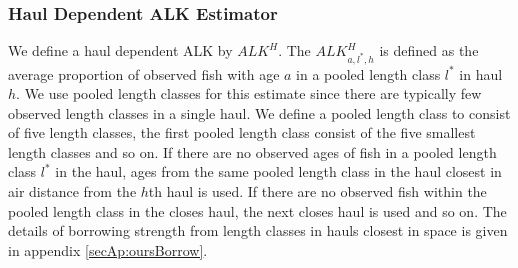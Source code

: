 \documentclass[a4paper 12pt]{article}
\numberwithin{equation}{section}
\begin{document}
\subsubsection{Haul Dependent ALK Estimator}
\label{sec:haulestimator}
We define a haul dependent ALK  by  $ALK^{H}$. The $ALK^{H}_{a,l^*,h}$ is defined as the average proportion of observed fish with age $a$ in a pooled length class $l^*$ in haul $h$. We use pooled length classes for this estimate since there are typically few observed length classes in a single haul. We define a pooled length class to consist of five length classes, the first pooled length class consist of the five smallest length classes and so on.  If there are no observed ages of fish in a pooled length class $l^*$ in the haul, ages from the same pooled length class in the haul closest in air distance from the $h$th haul is used. If there are no observed fish within the pooled length class in the closes haul, the next closes haul is used and so on.  The details of borrowing strength from length classes in hauls closest in space is given in appendix \ref{secAp:oursBorrow}. 
\end{document}
